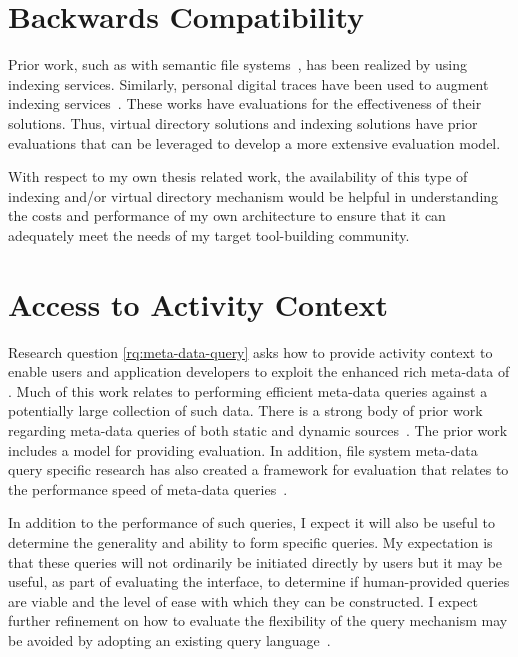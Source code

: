 \section{Backwards Compatibility}
\label{ch:evaluation:sec:existing-apps}

Prior work, such as with semantic file systems~\cite{gifford1991semantic}, has
been realized by using indexing services.  Similarly, personal digital traces
have been used to augment indexing services~\cite{vianna2019searching,Xu2014}.
These works have evaluations for the effectiveness of their solutions. Thus,
virtual directory solutions and indexing solutions have prior evaluations that
can be leveraged to develop a more extensive evaluation model.

With respect to my own thesis related work, the availability of this type of
indexing and/or virtual directory mechanism would be helpful in understanding
the costs and performance of my own architecture to ensure that it can
adequately meet the needs of my target tool-building community.

\section{Access to Activity Context}
\label{ch:evaluation:sec:providing-ac}


Research question \ref{rq:meta-data-query} asks how to provide activity context to
enable users and application developers to exploit the enhanced rich meta-data
of \system.  Much of this work
relates to performing efficient meta-data queries against a potentially large
collection of such data. There is a strong body of prior work regarding
meta-data queries of both static
and dynamic
sources~\cite{Strong,revol2011universal,smartstore,pindex,federatedMetaData,huo2016mbfs,Suguna2015,Parker-Wood2014,watson2017exploring,leung2009magellan,leung2009spyglass,niazi2017hopsfs,van2011efficient}.
The prior work includes a model for providing evaluation.  In addition,
file system meta-data query specific research has also created a framework for
evaluation that relates to the performance speed of meta-data
queries~\cite{ames2013qmds}.

In addition to the performance of such queries, I expect it will also be useful
to determine the generality and ability to form specific queries.  My
expectation is that these queries will not ordinarily be initiated directly by
users but it may be useful, as part of evaluating the interface, to determine if
human-provided queries are viable and the level of ease with which they can be
constructed.  I expect further refinement on how to evaluate the flexibility of
the query mechanism may be avoided by adopting an existing query
language~\cite{francis2018cypher,van2016pgql}.

